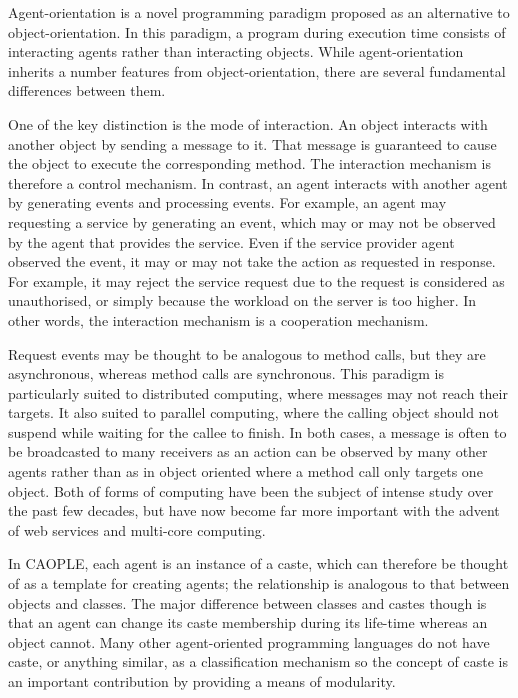 \documentclass[english]{report}
\begin{document}
Agent-orientation is a novel programming paradigm proposed as an 
alternative to object-orientation. In this paradigm,
a program during execution time consists of interacting agents rather
than interacting objects. While agent-orientation inherits a number 
features from object-orientation, there are several fundamental 
differences between them. 

One of the key distinction is the mode of interaction.
An object interacts with another object by sending a message to it.
That message is guaranteed to cause the object to execute the corresponding
method. The interaction mechanism is therefore a control mechanism. In contrast, an
agent interacts with another agent by generating events and processing events. 
For example, an agent may requesting a service by generating an event, which 
may or may not be observed by the agent that provides the service. Even if the 
service provider agent observed the event, it may or may not take the action as 
requested in response. For example, it may reject the service request due to 
the request is considered as unauthorised, or simply because the workload on 
the server is too higher. In other words, the interaction mechanism is a cooperation 
mechanism. 

Request events may be thought to be analogous to method calls, but they are
asynchronous, whereas method calls are synchronous. This
paradigm is particularly suited to distributed computing, where messages
may not reach their targets. It also suited to parallel computing, where the calling
object should not suspend while waiting for the callee to finish. In both cases, a 
message is often to be broadcasted to many receivers as an action can be 
observed by many other agents rather than as in object oriented where 
a method call only targets one object. 
Both of forms of computing have been the subject of intense
study over the past few decades, but have now become far more important
with the advent of web services and multi-core computing.

In CAOPLE, each agent is an instance of a caste, which can therefore
be thought of as a template for creating agents; the relationship
is analogous to that between objects and classes. The major difference
between classes and castes though is that an agent can change its
caste membership during its life-time whereas an object cannot. 
Many other agent-oriented
programming languages do not have caste, or anything similar, as a
classification mechanism so the concept of caste is an important contribution
by providing a means of modularity. 
\end{document}
